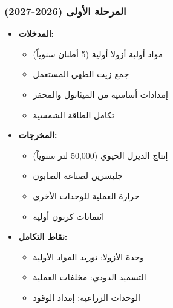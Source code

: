 \subsubsection{المرحلة الأولى (2026-2027)}
\begin{itemize}
    \item \textbf{المدخلات:}
    \begin{itemize}
        \item مواد أولية أزولا أولية (5 أطنان سنوياً)
        \item جمع زيت الطهي المستعمل
        \item إمدادات أساسية من الميثانول والمحفز
        \item تكامل الطاقة الشمسية
    \end{itemize}
    \item \textbf{المخرجات:}
    \begin{itemize}
        \item إنتاج الديزل الحيوي (50,000 لتر سنوياً)
        \item جليسرين لصناعة الصابون
        \item حرارة العملية للوحدات الأخرى
        \item ائتمانات كربون أولية
    \end{itemize}
    \item \textbf{نقاط التكامل:}
    \begin{itemize}
        \item وحدة الأزولا: توريد المواد الأولية
        \item التسميد الدودي: مخلفات العملية
        \item الوحدات الزراعية: إمداد الوقود
    \end{itemize}
\end{itemize}

